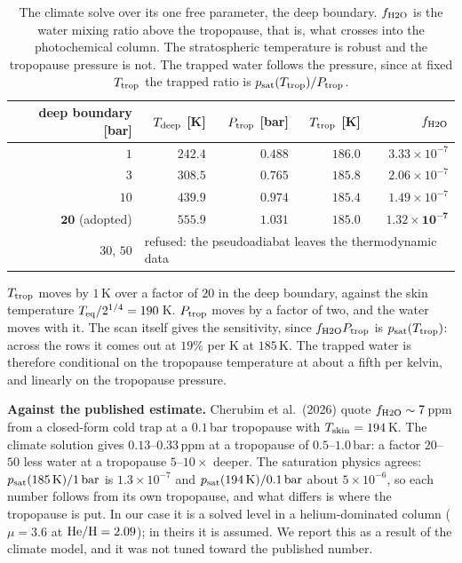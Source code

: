 \documentclass[english,a4paper]{my_memo}
\begin{document}
\begin{table}[htbp]\centering
\caption{The climate solve over its one free parameter, the deep boundary.
$f_{\rm H2O}$ is the water mixing ratio above the tropopause, that is, what
crosses into the photochemical column. The stratospheric temperature is
robust and the tropopause pressure is not. The trapped water follows the
pressure, since at fixed $T_{\rm trop}$ the trapped ratio is
$p_{\rm sat}(T_{\rm trop})/P_{\rm trop}$.}
\label{tab:coldtrap}
\begin{tabular}{rrrrr}
\toprule
deep boundary [bar] & $T_{\rm deep}$ [K] & $P_{\rm trop}$ [bar] &
$T_{\rm trop}$ [K] & $f_{\rm H2O}$ \\
\midrule
$1$  & $242.4$ & $0.488$ & $186.0$ & $3.33\times10^{-7}$ \\
$3$  & $308.5$ & $0.765$ & $185.8$ & $2.06\times10^{-7}$ \\
$10$ & $439.9$ & $0.974$ & $185.4$ & $1.49\times10^{-7}$ \\
$\mathbf{20}$ (adopted) & $\mathbf{555.9}$ & $\mathbf{1.031}$ &
$\mathbf{185.0}$ & $\mathbf{1.32\times10^{-7}}$ \\
$30$, $50$ & \multicolumn{4}{l}{refused: the pseudoadiabat leaves the
thermodynamic data} \\
\bottomrule
\end{tabular}
\end{table}

$T_{\rm trop}$ moves by $1$\,K over a factor of $20$ in the deep boundary,
against the skin temperature $T_{\rm eq}/2^{1/4} = 190$\,K. $P_{\rm trop}$
moves by a factor of two, and the water moves with it. The scan itself gives
the sensitivity, since $f_{\rm H2O}P_{\rm trop}$ is
$p_{\rm sat}(T_{\rm trop})$: across the rows it comes out at $19\%$ per K at
$185$\,K. The trapped water is therefore conditional on the tropopause
temperature at about a fifth per kelvin, and linearly on the tropopause
pressure.

\medskip
\noindent\textbf{Against the published estimate.} Cherubim et al.\ (2026)
quote $f_{\rm H2O} \sim 7$\,ppm from a closed-form cold trap at a $0.1$\,bar
tropopause with $T_{\rm skin} = 194$\,K. The climate solution gives
$0.13$--$0.33$\,ppm at a tropopause of $0.5$--$1.0$\,bar: a factor $20$--$50$
less water at a tropopause $5$--$10\times$ deeper. The saturation physics
agrees: $p_{\rm sat}(185\,{\rm K})/1\,{\rm bar}$ is $1.3\times10^{-7}$ and
$p_{\rm sat}(194\,{\rm K})/0.1\,{\rm bar}$ about $5\times10^{-6}$, so each
number follows from its own tropopause, and what differs is where the
tropopause is put. In our case it is a solved level in a helium-dominated
column ($\mu = 3.6$ at ${\rm He/H} = 2.09$); in theirs it is assumed. We
report this as a result of the climate model, and it was not tuned toward the
published number.
\end{document}
